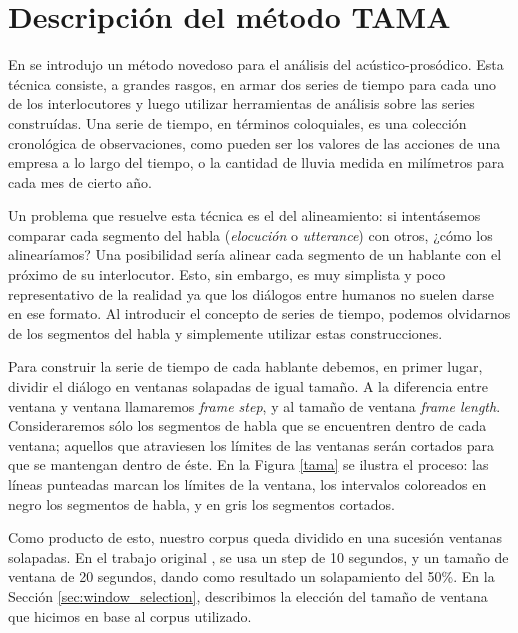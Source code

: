 \section{Descripción del método TAMA}
\label{sec:ant_tama}

En \cite{KOU2008} se introdujo un método novedoso para el análisis del \entrainment acústico-prosódico. Esta técnica consiste, a grandes rasgos, en armar dos series de tiempo para cada uno de los interlocutores y luego utilizar herramientas de análisis sobre las series construídas. Una serie de tiempo, en términos coloquiales, es una colección cronológica de observaciones, como pueden ser los valores de las acciones de una empresa a lo largo del tiempo, o la cantidad de lluvia medida en milímetros para cada mes de cierto año.

Un problema que resuelve esta técnica es el del alineamiento: si intentásemos comparar cada segmento del habla (\emph{elocución} o \emph{utterance}) con otros, ¿cómo los alinearíamos? Una posibilidad sería alinear cada segmento de un hablante con el próximo de su interlocutor. Esto, sin embargo, es muy simplista y poco representativo de la realidad ya que los diálogos entre humanos no suelen darse en ese formato. Al introducir el concepto de series de tiempo, podemos olvidarnos de los segmentos del habla y simplemente utilizar estas construcciones.

Para construir la serie de tiempo de cada hablante debemos, en primer lugar, dividir el diálogo en ventanas solapadas de igual tamaño. A la diferencia entre ventana y ventana llamaremos \emph{frame step}, y al tamaño de ventana \emph{frame length}. Consideraremos sólo los segmentos de habla que se encuentren dentro de cada ventana; aquellos que atraviesen los límites de las ventanas serán cortados para que se mantengan dentro de éste. En la Figura \ref{tama} se ilustra el proceso: las líneas punteadas marcan los límites de la ventana, los intervalos coloreados en negro los segmentos de habla, y en gris los segmentos cortados.

Como producto de esto, nuestro corpus queda dividido en una sucesión ventanas solapadas. En el trabajo original \cite{KOU2008}, se usa un step de 10 segundos, y un tamaño de ventana de 20 segundos, dando como resultado un solapamiento del 50\%. En la Sección \ref{sec:window_selection}, describimos la elección del tamaño de ventana que hicimos en base al corpus utilizado.

